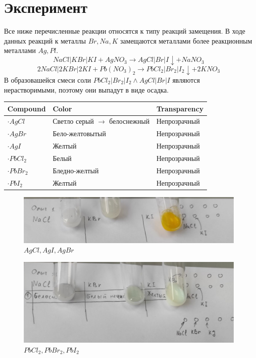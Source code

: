 \section{Эксперимент}
Все ниже перечисленные реакции относятся к типу 
реакций замещения. В ходе данных реакций к металлы 
$Br, Na, K$ замещаются металлами более реакционным 
металлами $Ag, Pl$. 
\begin{equation} 
    NaCl|KBr|KI + AgNO_3 \to  AgCl|Br|I\downarrow + NaNO_3
\end{equation} 
\begin{equation} 
    2NaCl|2KBr|2KI + Pb(NO_3)_2 \to PbCl_2|Br_2|I_2\downarrow  + 2 KNO_3
\end{equation} 
В образовашейся смеси соли $PbCl_2|Br_2|I_2 \land AgCl|Br|I$
являются нерастворимыми, поэтому они выпадут 
в виде осадка.

\begin{center}
\begin{tabular}{l||l||l}
    Compound & Color & Transparency \\ \hline \hline
    $\cdot AgCl$ & Светло серый $\to$ белоснежный & Непрозрачный \\
    $\cdot AgBr$ & Бело-желтовытый & Непрозрачный\\
    $\cdot AgI$ & Желтый & Непрозрачный\\
    $\cdot PbCl_2$ & Белый & Непрозрачный \\
    $\cdot PbBr_2$ & Бледно-желтый & Непрозрачный \\
    $\cdot PbI_2$ & Желтый & Непрозрачный \\
\end{tabular}
\end{center}

\begin{figure}[h]
    \centering
    \includegraphics[width=1\linewidth]{Ex_1/1.jpg}
     \caption{$AgCl, AgI, AgBr$}
    \label{ex_1_1}
\end{figure}

\begin{figure}[h]
    \centering
    \includegraphics[width=1\linewidth]{Ex_1/2.jpg}
     \caption{$PbCl_2, PbBr_2, PbI_2$}
    \label{ex_1_2}
\end{figure}